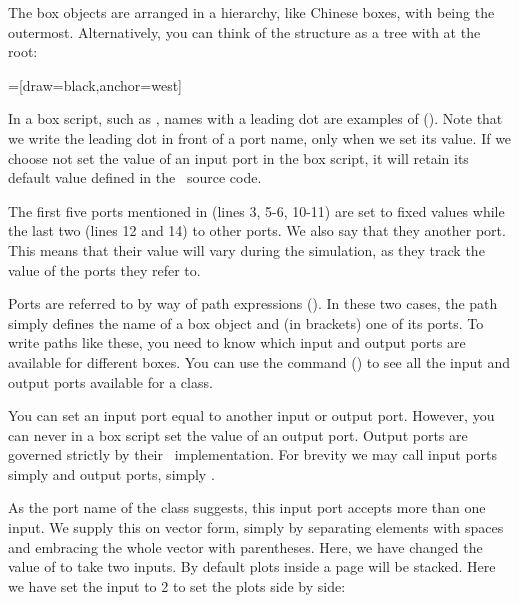 The box objects are arranged in a hierarchy, like Chinese boxes, with  being the outermost. Alternatively, you can think of the structure as a tree with  at the root:

\medskip
{}=[draw=black,anchor=west]

\bigskip
In a box script, such as , names with a leading dot are examples of  (). Note that we write the leading dot in front of a port name, only when we set its value. If we choose not set the value of an input port in the box script, it will retain its default value defined in the \CPP\ source code.

The first five ports mentioned in  (lines 3, 5-6, 10-11) are set to fixed values while the last two (lines 12 and 14)  to other ports. We also say that they  another port. This means that their value will vary during the simulation, as they track the value of the ports they refer to. 

Ports are referred to by way of path expressions (). In these two cases, the path simply defines the name of a box object and (in brackets) one of its ports. To write paths like these, you need to know which input and output ports are available for different boxes. You can use the  command () to see all the input and output ports available for a class.

You can set an input port equal to another input or output port. However, you can never in a box script set the value of an output port. Output ports are governed strictly by their \CPP\ implementation. For brevity we may call input ports simply  and output ports, simply .

As the port name  of the  class suggests, this input port accepts more than one input. We supply this on vector form, simply by separating elements with spaces and embracing the whole vector with parentheses. Here, we have changed the value of  to take two inputs. By default plots inside a page will be stacked. Here we have set the  input to 2 to set the plots side by side:


